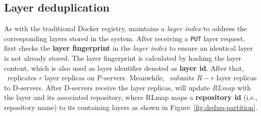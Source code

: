 \subsection{Layer deduplication}
\label{sec:dedup-desgin}


%

%


As with the traditional Docker registry, 
\sysname maintains a \emph{layer index} to address the corresponding layers stored in the system.
After receiving a \texttt{PUT} layer request,
\sysname first checks the \textbf{layer fingerprint} in the \emph{layer index} to ensure 
an identical layer is not already stored.
The layer fingerprint is calculated by hashing the layer content, which is also used as layer identifier denoted as \textbf{layer id}.
After that, \sysname~replicates $r$ layer replicas on P-servers. 
Meanwhile, \sysname~submits $R-r$ layer replicas to D-servers.
 After D-servers receive the layer replicas,
 \sysname will update \emph{RLmap} with the layer and its associated repository, where
RLmap maps a \textbf{repository id} (i.e., repository name) to its containing layers 
as shown in Figure~\ref{fig:dedup-partition}.

 

